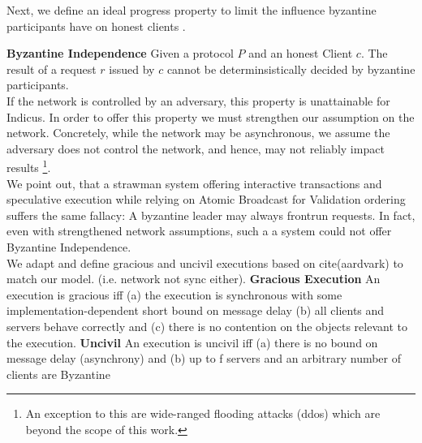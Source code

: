 Next, we define an ideal progress property to limit the influence byzantine participants have on honest clients . 

\textbf{Byzantine Independence}
Given a protocol $P$ and an honest Client $c$. The result of a request $r$ issued by $c$ cannot be determinsistically decided by byzantine participants.  \\

If the network is controlled by an adversary, this property is unattainable for Indicus. 
In order to offer this property we must strengthen our assumption on the network. Concretely, while the network may be asynchronous, we assume the adversary does not control the network, and hence, may not reliably impact results \footnote{An exception to this are wide-ranged flooding attacks (ddos) which are beyond the scope of this work.}. \\

We point out, that a strawman system offering interactive transactions and speculative execution while relying on Atomic Broadcast for Validation ordering suffers the same fallacy: A byzantine leader may always frontrun requests. In fact, even with strengthened network assumptions, such a a system could not offer Byzantine Independence.\\

We adapt and define gracious and uncivil executions based on cite(aardvark) to match our model. (i.e. network not sync either).
\textbf{Gracious Execution}
An execution is gracious iff (a) the execution is synchronous with some
implementation-dependent short bound on message delay (b) all clients and servers behave correctly and (c) there is no contention on the objects relevant to the execution.
\textbf{Uncivil}
An execution is uncivil iff (a) there is no bound on message delay (asynchrony) and (b) up to f servers and an arbitrary number of clients are Byzantine 


